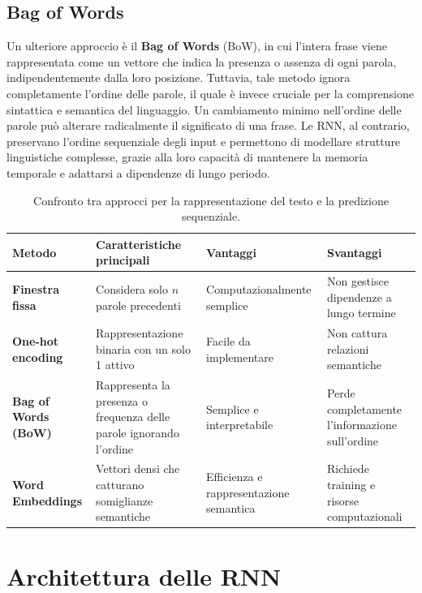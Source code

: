 \subsection{Bag of Words}

Un ulteriore approccio è il \textbf{Bag of Words} (BoW), in cui l'intera frase viene rappresentata come un vettore che indica la presenza o assenza di ogni parola, indipendentemente dalla loro posizione. Tuttavia, tale metodo ignora completamente l’ordine delle parole, il quale è invece cruciale per la comprensione sintattica e semantica del linguaggio. Un cambiamento minimo nell’ordine delle parole può alterare radicalmente il significato di una frase. Le RNN, al contrario, preservano l’ordine sequenziale degli input e permettono di modellare strutture linguistiche complesse, grazie alla loro capacità di mantenere la memoria temporale e adattarsi a dipendenze di lungo periodo.

\begin{table}[htbp]
\centering
\footnotesize
\caption{Confronto tra approcci per la rappresentazione del testo e la predizione sequenziale.}
\begin{adjustbox}{width=\textwidth}
\begin{tabular}{l|p{3.8cm}|p{3.5cm}|p{3.5cm}}
\hline
\textbf{Metodo} & \textbf{Caratteristiche principali} & \textbf{Vantaggi} & \textbf{Svantaggi} \\
\hline
\textbf{Finestra fissa} & Considera solo $n$ parole precedenti & Computazionalmente semplice & Non gestisce dipendenze a lungo termine \\
\hline
\textbf{One-hot encoding} & Rappresentazione binaria con un solo 1 attivo & Facile da implementare & Non cattura relazioni semantiche \\
\hline
\textbf{Bag of Words (BoW)} & Rappresenta la presenza o frequenza delle parole ignorando l’ordine & Semplice e interpretabile & Perde completamente l’informazione sull’ordine \\
\hline
\textbf{Word Embeddings} & Vettori densi che catturano somiglianze semantiche & Efficienza e rappresentazione semantica & Richiede training e risorse computazionali \\
\hline
\end{tabular}
\end{adjustbox}
\label{tab:metodi_sequenziali}
\end{table}

\section{Architettura delle RNN}

